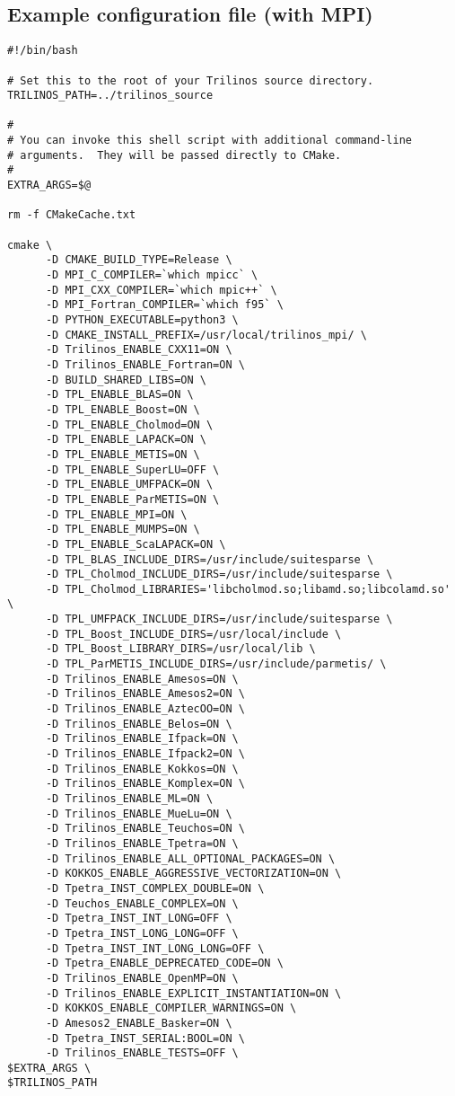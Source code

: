 \subsection{Example configuration file (with MPI)}
\begin{verbatim}
#!/bin/bash

# Set this to the root of your Trilinos source directory.
TRILINOS_PATH=../trilinos_source

#
# You can invoke this shell script with additional command-line
# arguments.  They will be passed directly to CMake.
#
EXTRA_ARGS=$@

rm -f CMakeCache.txt

cmake \
      -D CMAKE_BUILD_TYPE=Release \
      -D MPI_C_COMPILER=`which mpicc` \
      -D MPI_CXX_COMPILER=`which mpic++` \
      -D MPI_Fortran_COMPILER=`which f95` \
      -D PYTHON_EXECUTABLE=python3 \
      -D CMAKE_INSTALL_PREFIX=/usr/local/trilinos_mpi/ \
      -D Trilinos_ENABLE_CXX11=ON \
      -D Trilinos_ENABLE_Fortran=ON \
      -D BUILD_SHARED_LIBS=ON \
      -D TPL_ENABLE_BLAS=ON \
      -D TPL_ENABLE_Boost=ON \
      -D TPL_ENABLE_Cholmod=ON \
      -D TPL_ENABLE_LAPACK=ON \
      -D TPL_ENABLE_METIS=ON \
      -D TPL_ENABLE_SuperLU=OFF \
      -D TPL_ENABLE_UMFPACK=ON \
      -D TPL_ENABLE_ParMETIS=ON \
      -D TPL_ENABLE_MPI=ON \
      -D TPL_ENABLE_MUMPS=ON \
      -D TPL_ENABLE_ScaLAPACK=ON \
      -D TPL_BLAS_INCLUDE_DIRS=/usr/include/suitesparse \
      -D TPL_Cholmod_INCLUDE_DIRS=/usr/include/suitesparse \
      -D TPL_Cholmod_LIBRARIES='libcholmod.so;libamd.so;libcolamd.so' \
      -D TPL_UMFPACK_INCLUDE_DIRS=/usr/include/suitesparse \
      -D TPL_Boost_INCLUDE_DIRS=/usr/local/include \
      -D TPL_Boost_LIBRARY_DIRS=/usr/local/lib \
      -D TPL_ParMETIS_INCLUDE_DIRS=/usr/include/parmetis/ \
      -D Trilinos_ENABLE_Amesos=ON \
      -D Trilinos_ENABLE_Amesos2=ON \
      -D Trilinos_ENABLE_AztecOO=ON \
      -D Trilinos_ENABLE_Belos=ON \
      -D Trilinos_ENABLE_Ifpack=ON \
      -D Trilinos_ENABLE_Ifpack2=ON \
      -D Trilinos_ENABLE_Kokkos=ON \
      -D Trilinos_ENABLE_Komplex=ON \
      -D Trilinos_ENABLE_ML=ON \
      -D Trilinos_ENABLE_MueLu=ON \
      -D Trilinos_ENABLE_Teuchos=ON \
      -D Trilinos_ENABLE_Tpetra=ON \
      -D Trilinos_ENABLE_ALL_OPTIONAL_PACKAGES=ON \
      -D KOKKOS_ENABLE_AGGRESSIVE_VECTORIZATION=ON \
      -D Tpetra_INST_COMPLEX_DOUBLE=ON \
      -D Teuchos_ENABLE_COMPLEX=ON \
      -D Tpetra_INST_INT_LONG=OFF \
      -D Tpetra_INST_LONG_LONG=OFF \
      -D Tpetra_INST_INT_LONG_LONG=OFF \
      -D Tpetra_ENABLE_DEPRECATED_CODE=ON \
      -D Trilinos_ENABLE_OpenMP=ON \
      -D Trilinos_ENABLE_EXPLICIT_INSTANTIATION=ON \
      -D KOKKOS_ENABLE_COMPILER_WARNINGS=ON \
      -D Amesos2_ENABLE_Basker=ON \
      -D Tpetra_INST_SERIAL:BOOL=ON \
      -D Trilinos_ENABLE_TESTS=OFF \
$EXTRA_ARGS \
$TRILINOS_PATH
\end{verbatim}